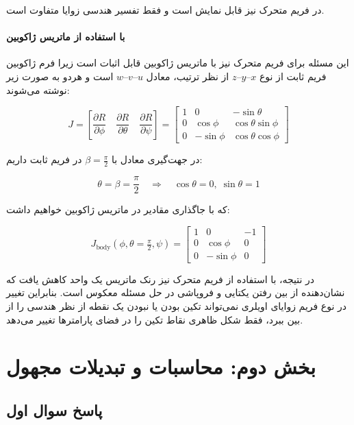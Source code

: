 \documentclass{article}
\begin{document}
در فریم متحرک نیز قابل نمایش است و فقط تفسیر هندسی زوایا متفاوت است.

\paragraph{با استفاده از ماتریس ژاکوبین}

این مسئله برای فریم متحرک نیز با ماتریس ژاکوبین قابل اثبات است زیرا فرم ژاکوبین فریم ثابت از نوع $x$--$y$--$z$ از نظر ترتیب، معادل $u$--$v$--$w$ است و هردو به صورت زیر نوشته می‌شوند:

\[J =
\left[
\frac{\partial R}{\partial \phi}
\quad
\frac{\partial R}{\partial \theta}
\quad
\frac{\partial R}{\partial \psi}
\right] =
\begin{bmatrix}
	1 & 0 & -\sin\theta\\
	0 & \cos\phi & \cos\theta \sin\phi\\
	0 & -\sin\phi & \cos\theta \cos\phi
\end{bmatrix}
\]

در جهت‌گیری معادل با  $\beta = \frac{\pi}{2}$ در فریم ثابت داریم:

\[
\theta = \beta = \frac{\pi}{2}
\quad \Rightarrow \quad
\cos\theta = 0,\; \sin\theta = 1
\]

که با جاگذاری مقادیر در ماتریس ژاکوبین خواهیم داشت:

\[
J_{\text{body}}(\phi,\theta=\tfrac{\pi}{2},\psi) =
\begin{bmatrix}
	1 & 0 & -1\\
	0 & \cos\phi & 0\\
	0 & -\sin\phi & 0
\end{bmatrix}
\]

در نتیجه، با استفاده از فریم متحرک نیز رنک ماتریس یک واحد کاهش یافت که نشان‌دهنده از بین رفتن یکتایی و فروپاشی در حل مسئله معکوس است.
بنابراین تغییر در نوع فریم زوایای اویلری نمی‌تواند تکین بودن یا نبودن یک نقطه از نظر هندسی را از بین ببرد، فقط شکل ظاهری نقاط تکین‌ را در فضای پارامترها تغییر می‌دهد.





\newpage
\section{بخش دوم: محاسبات و تبدیلات مجهول}

\subsection{پاسخ سوال اول}
\end{document}

